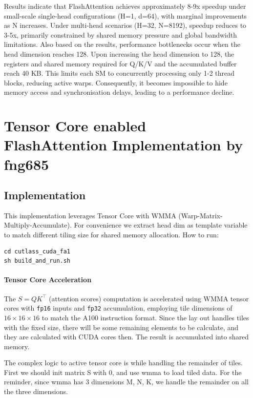\documentclass[11pt]{article}
\begin{document}
Results indicate that FlashAttention achieves approximately 8-9x speedup under small-scale single-head configurations (H=1, d=64), with marginal improvements as N increases. Under multi-head scenarios (H=32, N=8192), speedup reduces to 3-5x, primarily constrained by shared memory pressure and global bandwidth limitations.
Also based on the results, performance bottlenecks occur when the head dimension reaches 128. Upon increasing the head dimension to 128, the registers and shared memory required for Q/K/V and the accumulated buffer reach 40 KB. This limits each SM to concurrently processing only 1-2 thread blocks, reducing active warps. Consequently, it becomes impossible to hide memory access and synchronisation delays, leading to a performance decline.

\section{Tensor Core enabled FlashAttention Implementation by fng685}

\subsection{Implementation}

This implementation leverages Tensor Core with WMMA (Warp-Matrix-Multiply-Accumulate). For convenience we extract head dim as template variable to match different tiling size for shared memory allocation. How to run:

\begin{lstlisting}
cd cutlass_cuda_fa1
sh build_and_run.sh
\end{lstlisting}


\paragraph{Tensor Core Acceleration}
The $S = Q K^{\top}$ (attention scores) computation is accelerated using WMMA tensor cores with \texttt{fp16} inputs and \texttt{fp32} accumulation, employing tile dimensions of $16 \times 16 \times 16$ to match the A100 instruction format. Since the lay out handles tiles with the fixed size, there will be some remaining elements to be calculate, and they are calculated with CUDA cores then. The result is accumulated into shared memory.

The complex logic to active tensor core is while handling the remainder of tiles. First we should init matrix S with 0, and use wmma to load tiled data. For the reminder, since wmma has 3 dimensions M, N, K, we handle the remainder on all the three dimensions.
\end{document}
